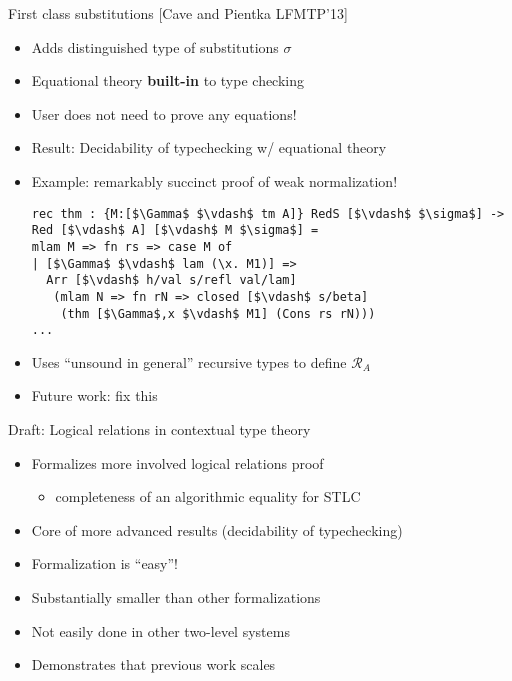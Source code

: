 \documentclass[usenames,dvipsnames]{beamer}
\begin{document}
\begin{frame}[fragile]{First class substitutions [Cave and Pientka LFMTP'13]}
\begin{itemize}
\item Adds distinguished type of substitutions $\sigma$
\item Equational theory \textbf{built-in} to type checking
\item User does not need to prove any equations!
\item Result: Decidability of typechecking w/ equational theory
\item Example: remarkably succinct proof of weak normalization!
\begin{lstlisting}
rec thm : {M:[$\Gamma$ $\vdash$ tm A]} RedS [$\vdash$ $\sigma$] -> Red [$\vdash$ A] [$\vdash$ M $\sigma$] =
mlam M => fn rs => case M of
| [$\Gamma$ $\vdash$ lam (\x. M1)] =>
  Arr [$\vdash$ h/val s/refl val/lam]
   (mlam N => fn rN => closed [$\vdash$ s/beta]
    (thm [$\Gamma$,x $\vdash$ M1] (Cons rs rN)))
...
\end{lstlisting}
\item Uses ``unsound in general'' recursive types to define $\mathcal{R}_A$
\item Future work: fix this
\end{itemize}
\end{frame}

\begin{frame}{Draft: Logical relations in contextual type theory}
\begin{itemize}
\item Formalizes more involved logical relations proof
\begin{itemize}
\item completeness of an algorithmic equality for STLC
\end{itemize}
\item Core of more advanced results (decidability of typechecking)
\item Formalization is ``easy''!
\item Substantially smaller than other formalizations
\item Not easily done in other two-level systems
\item Demonstrates that previous work scales
\end{itemize}
\end{frame}
\end{document}
